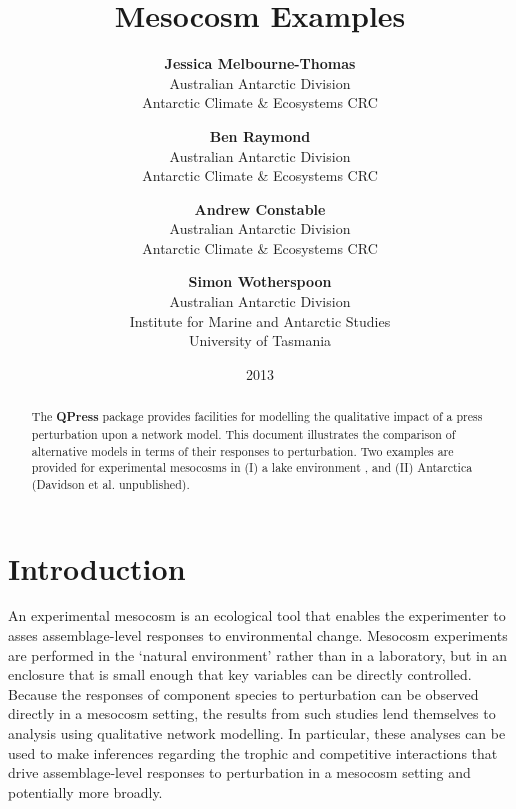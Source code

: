 \documentclass[a4paper]{article}\usepackage[]{graphicx}\usepackage[]{color}
\begin{document}

\title{Mesocosm Examples}
\date{2013}
\author{\textbf{Jessica Melbourne-Thomas} \\
Australian Antarctic Division\\
Antarctic Climate \& Ecosystems CRC\\
\and \textbf{Ben Raymond} \\
Australian Antarctic Division\\
Antarctic Climate \& Ecosystems CRC\\
\and \textbf{Andrew Constable} \\
Australian Antarctic Division\\
Antarctic Climate \& Ecosystems CRC\\
\and \textbf{Simon Wotherspoon} \\
Australian Antarctic Division\\
Institute for Marine and Antarctic Studies\\
University of Tasmania}
\maketitle

\begin{abstract}
The \textbf{QPress} package provides facilities for modelling the qualitative
impact of a press perturbation upon a network model. This document illustrates
the comparison of alternative models in terms of their responses to perturbation.
Two examples are provided for experimental mesocosms in (I) a lake environment
\citep{Hulot2000}, and (II) Antarctica (Davidson et al. unpublished).
\end{abstract}

\section{Introduction}
\label{sec:introduction}
An experimental mesocosm is an ecological tool that enables the experimenter to
asses assemblage-level responses to environmental change. Mesocosm experiments
are performed in the `natural environment' rather than in a laboratory, but in
an enclosure that is small enough that key variables can be directly controlled.
Because the responses of component species to perturbation can be observed
directly in a mesocosm setting, the results from such studies lend themselves to
analysis using qualitative network modelling. In particular, these analyses can
be used to make inferences regarding the trophic and competitive interactions
that drive assemblage-level responses to perturbation in a mesocosm setting and
potentially more broadly.
\end{document}
